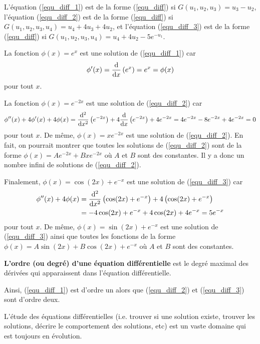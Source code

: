 {\begin{egg}
L'équation (\ref{equ_diff_1}) est de la forme (\ref{equ_diff}) si
$G(u_1,u_2,u_3) = u_3 - u_2$,  l'équation (\ref{equ_diff_2}) est de la
forme (\ref{equ_diff}) si $G(u_1,u_2,u_3,u_4) = u_4 +4u_3 +4u_2$, et
l'équation (\ref{equ_diff_3}) est de la forme (\ref{equ_diff}) si
$G(u_1,u_2,u_3,u_4) = u_4 +4u_2 - 5e^{-u_1}$.

La fonction $\phi(x) = e^x$ est une solution de (\ref{equ_diff_1}) car
\[
\phi'(x) = \dfdx{\left(e^x\right)}{x} = e^x = \phi(x)
\]
pour tout $x$.

La fonction $\phi(x) = e^{-2x}$ est une solution de (\ref{equ_diff_2})
car
\[
\phi''(x) + 4 \phi'(x) + 4 \phi(x)
=\dfdxn{\left( e^{-2x}\right)}{x}{2}
+ 4 \dfdx{\left(e^{-2x}\right)}{x} + 4 e^{-2x}
= 4 e^{-2x} -8 e^{-2x} + 4 e^{-2x} = 0
\]
pour tout $x$.  De même, $\phi(x) = xe^{-2x}$ est une solution de
(\ref{equ_diff_2}).  En fait, on pourrait montrer que toutes les
solutions de (\ref{equ_diff_2}) sont de la forme
$\phi(x) = A e^{-2x} + Bx e^{-2x}$ où $A$ et $B$ sont des
constantes.  Il y a donc un nombre infini de solutions de
(\ref{equ_diff_2}).

Finalement, $\phi(x)=\cos(2x) + e^{-x}$ est une solution de
(\ref{equ_diff_3}) car
\begin{align*}
\phi''(x) + 4 \phi(x)
&= \dfdxn{\left(\cos(2x)+e^{-x}\right)}{x}{2}
+ 4 \left(\cos(2x)+e^{-x}\right) \\
&= -4\cos(2x) + e^{-x} + 4\cos(2x) + 4 e^{-x} = 5 e^{-x}
\end{align*}
pour tout $x$.  De même, $\phi(x)=\sin(2x) + e^{-x}$ est une solution de
(\ref{equ_diff_3}) ainsi que toutes les fonctions de
la forme $\phi(x) = A \sin(2x) + B\cos(2x) + e^{-x}$ où $A$ et $B$
sont des constantes.
\end{egg}

\begin{focus}{\dfn}
{\bfseries L'ordre (ou degré) d'une équation différentielle} est le
degré maximal des dérivées qui apparaissent dans l'équation
différentielle.
\end{focus}

Ainsi, (\ref{equ_diff_1}) est d'ordre un alors que (\ref{equ_diff_2})
et (\ref{equ_diff_3}) sont d'ordre deux.

L'étude des équations différentielles (i.e. trouver si une solution
existe, trouver les solutions, décrire le comportement des solutions,
etc) est un vaste domaine qui est toujours en évolution.

}
